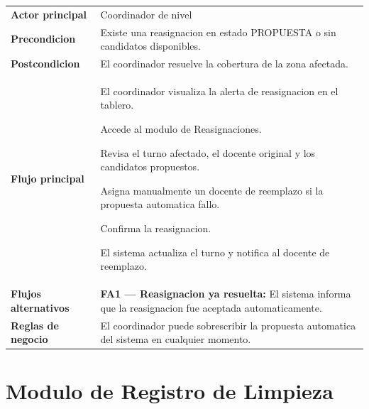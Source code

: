 \documentclass[12pt, a4paper]{article}
\newcommand{\cu}[3]{%
  \begin{tcolorbox}[casousostyle, title={#1},
    after title={\hfill\small\normalfont\color{white!80!azulOscuro}#2}]
  \renewcommand{\arraystretch}{1.35}
  \begin{tabularx}{\linewidth}{>{\bfseries\color{azulOscuro}\small}p{3.6cm} X}
  #3
  \end{tabularx}
  \end{tcolorbox}
  \vspace{6pt}
}
\newcommand{\fcu}[2]{\small\textbf{\color{azulOscuro}#1} & \small #2 \\}
\begin{document}
\cu{CU-10 --- Gestionar reasignacion}{Coordinador}{
  \fcu{Actor principal}{Coordinador de nivel}
  \fcu{Precondicion}{Existe una reasignacion en estado PROPUESTA o sin candidatos disponibles.}
  \fcu{Postcondicion}{El coordinador resuelve la cobertura de la zona afectada.}
  \fcu{Flujo principal}{
    \begin{pasos}
      \item El coordinador visualiza la alerta de reasignacion en el tablero.
      \item Accede al modulo de Reasignaciones.
      \item Revisa el turno afectado, el docente original y los candidatos propuestos.
      \item Asigna manualmente un docente de reemplazo si la propuesta automatica fallo.
      \item Confirma la reasignacion.
      \item El sistema actualiza el turno y notifica al docente de reemplazo.
    \end{pasos}
  }
  \fcu{Flujos alternativos}{
    \textbf{FA1 --- Reasignacion ya resuelta:} El sistema informa que la reasignacion fue aceptada automaticamente.
  }
  \fcu{Reglas de negocio}{El coordinador puede sobrescribir la propuesta automatica del sistema en cualquier momento.}
}

\newpage

\section{Modulo de Registro de Limpieza}
\end{document}
